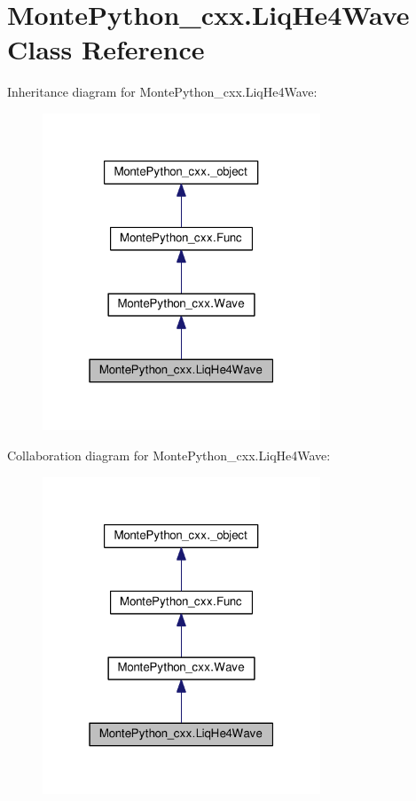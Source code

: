 \hypertarget{classMontePython__cxx_1_1LiqHe4Wave}{}\section{Monte\+Python\+\_\+cxx.\+Liq\+He4\+Wave Class Reference}
\label{classMontePython__cxx_1_1LiqHe4Wave}


Inheritance diagram for Monte\+Python\+\_\+cxx.\+Liq\+He4\+Wave\+:
\nopagebreak
\begin{figure}[H]
\begin{center}
\leavevmode
\includegraphics[width=235pt]{classMontePython__cxx_1_1LiqHe4Wave__inherit__graph}
\end{center}
\end{figure}


Collaboration diagram for Monte\+Python\+\_\+cxx.\+Liq\+He4\+Wave\+:
\nopagebreak
\begin{figure}[H]
\begin{center}
\leavevmode
\includegraphics[width=235pt]{classMontePython__cxx_1_1LiqHe4Wave__coll__graph}
\end{center}
\end{figure}
